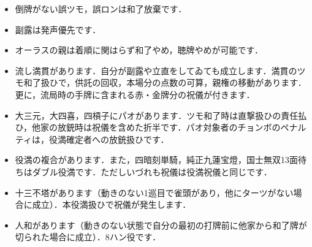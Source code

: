 \documentclass[uplatex]{jsarticle}
\theoremstyle{definition}
\begin{document}
\begin{itemize}
    \item 倒牌がない誤ツモ，誤ロンは和了放棄です．
    \item 副露は発声優先です．
    \item オーラスの親は着順に関はらず和了やめ，聴牌やめが可能です．
    \item 流し満貫があります．自分が副露や立直をしてゐても成立します．満貫のツモ和了扱ひで，供託の回収，本場分の点数の可算，親権の移動があります．更に，流局時の手牌に含まれる赤・金牌分の祝儀が付きます．
    \item 大三元，大四喜，四槓子にパオがあります．ツモ和了時は直撃扱ひの責任払ひ，他家の放銃時は祝儀を含めた折半です．パオ対象者のチョンボのペナルティは，役満確定者への放銃扱ひです．
    \item 役満の複合があります．また，四暗刻単騎，純正九蓮宝燈，国士無双13面待ちはダブル役満です．ただしいづれも祝儀は役満祝儀と同じです．
    \item 十三不塔があります（動きのない1巡目で雀頭があり，他にターツがない場合に成立）．本役満扱ひで祝儀が発生します．
    \item 人和があります（動きのない状態で自分の最初の打牌前に他家から和了牌が切られた場合に成立）．8ハン役です．
    \end{itemize}
\end{document}
